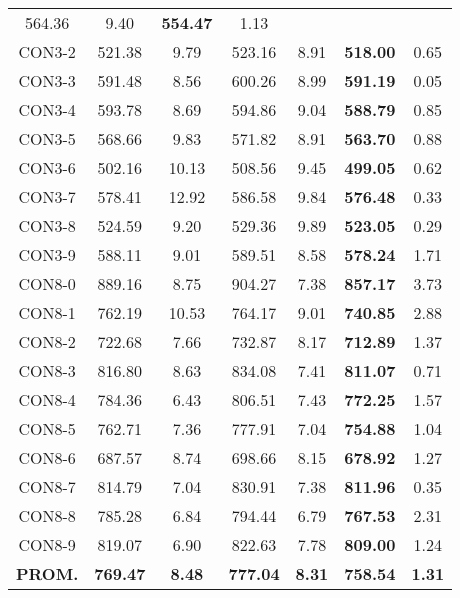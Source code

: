 \begin{table}[ht]
\begin{tabular}{c c c c c c c}
564.36 & 9.40 & \bf{554.47} & 
1.13\\CON3-2 & 521.38 & 9.79 & 
523.16 & 8.91 & \bf{518.00} & 
0.65\\CON3-3 & 591.48 & 8.56 & 
600.26 & 8.99 & \bf{591.19} & 
0.05\\CON3-4 & 593.78 & 8.69 & 
594.86 & 9.04 & \bf{588.79} & 
0.85\\CON3-5 & 568.66 & 9.83 & 
571.82 & 8.91 & \bf{563.70} & 
0.88\\CON3-6 & 502.16 & 10.13 & 
508.56 & 9.45 & \bf{499.05} & 
0.62\\CON3-7 & 578.41 & 12.92 & 
586.58 & 9.84 & \bf{576.48} & 
0.33\\CON3-8 & 524.59 & 9.20 & 
529.36 & 9.89 & \bf{523.05} & 
0.29\\CON3-9 & 588.11 & 9.01 & 
589.51 & 8.58 & \bf{578.24} & 
1.71\\CON8-0 & 889.16 & 8.75 & 
904.27 & 7.38 & \bf{857.17} & 
3.73\\CON8-1 & 762.19 & 10.53 & 
764.17 & 9.01 & \bf{740.85} & 
2.88\\CON8-2 & 722.68 & 7.66 & 
732.87 & 8.17 & \bf{712.89} & 
1.37\\CON8-3 & 816.80 & 8.63 & 
834.08 & 7.41 & \bf{811.07} & 
0.71\\CON8-4 & 784.36 & 6.43 & 
806.51 & 7.43 & \bf{772.25} & 
1.57\\CON8-5 & 762.71 & 7.36 & 
777.91 & 7.04 & \bf{754.88} & 
1.04\\CON8-6 & 687.57 & 8.74 & 
698.66 & 8.15 & \bf{678.92} & 
1.27\\CON8-7 & 814.79 & 7.04 & 
830.91 & 7.38 & \bf{811.96} & 
0.35\\CON8-8 & 785.28 & 6.84 & 
794.44 & 6.79 & \bf{767.53} & 
2.31\\CON8-9 & 819.07 & 6.90 & 
822.63 & 7.78 & \bf{809.00} & 
1.24\\\bf{PROM.} & 
\bf{769.47} & \bf{8.48} & \bf{777.04} & \bf{8.31} & \bf{758.54} & \bf{1.31}\\[1ex]\hline
\end{tabular}
\label{table:nonlin}
\end{table} \clearpage
